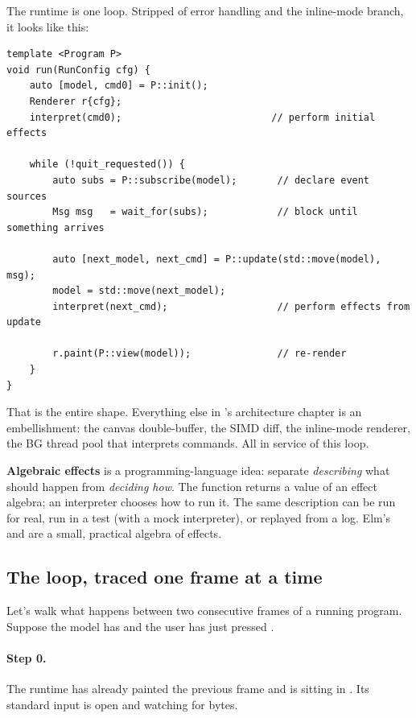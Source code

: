 The  runtime is one loop. Stripped of error handling
and the inline-mode branch, it looks like this:

\begin{lstlisting}
template <Program P>
void run(RunConfig cfg) {
    auto [model, cmd0] = P::init();
    Renderer r{cfg};
    interpret(cmd0);                          // perform initial effects

    while (!quit_requested()) {
        auto subs = P::subscribe(model);       // declare event sources
        Msg msg   = wait_for(subs);            // block until something arrives

        auto [next_model, next_cmd] = P::update(std::move(model), msg);
        model = std::move(next_model);
        interpret(next_cmd);                   // perform effects from update

        r.paint(P::view(model));               // re-render
    }
}
\end{lstlisting}

That is the entire shape. Everything else in \maya{}'s architecture
chapter is an embellishment: the canvas double-buffer, the SIMD diff,
the inline-mode renderer, the BG thread pool that interprets
 commands. All in service of this loop.

\begin{theory}
\textbf{Algebraic effects} is a programming-language idea: separate
\emph{describing} what should happen from \emph{deciding how}. The
function returns a value of an effect algebra; an interpreter chooses
how to run it. The same description can be run for real, run in a
test (with a mock interpreter), or replayed from a log. Elm's
 and  are a small, practical algebra of effects.
\end{theory}

\subsection{The loop, traced one frame at a time}
\label{sec:elm:trace}

Let's walk what happens between two consecutive frames of a running
program. Suppose the model has  and the user has
just pressed \code{+}.

\paragraph{Step 0.} The runtime has already painted the previous
frame and is sitting in . Its standard input is
open and watching for bytes.

